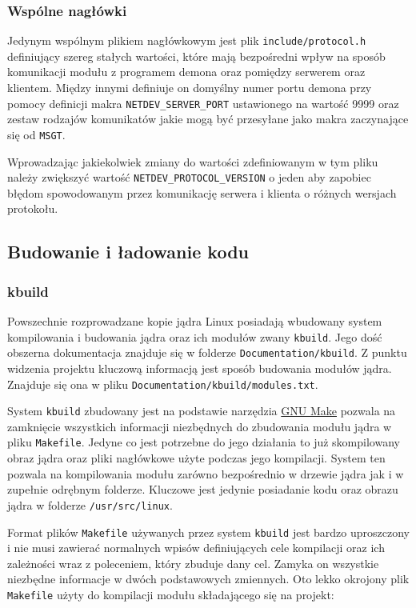 \documentclass[10pt]{article}
\begin{document}
\subsubsection{Wspólne nagłówki}

Jedynym wspólnym plikiem nagłówkowym jest plik
\texttt{include/protocol.h} definiujący szereg stałych wartości, które
mają bezpośredni wpływ na sposób komunikacji modułu z programem demona
oraz pomiędzy serwerem oraz klientem. Między innymi definiuje on
domyślny numer portu demona przy pomocy definicji makra
\texttt{NETDEV\_SERVER\_PORT} ustawionego na wartość 9999 oraz zestaw
rodzajów komunikatów jakie mogą być przesyłane jako makra zaczynające
się od \texttt{MSGT}.

Wprowadzając jakiekolwiek zmiany do wartości zdefiniowanym w tym pliku
należy zwiększyć wartość \texttt{NETDEV\_PROTOCOL\_VERSION} o jeden aby
zapobiec błędom spowodowanym przez komunikację serwera i klienta o
różnych wersjach protokołu.

\subsection{Budowanie i ładowanie kodu}

\subsubsection{kbuild}

Powszechnie rozprowadzane kopie jądra Linux posiadają wbudowany system
kompilowania i budowania jądra oraz ich modułów zwany \texttt{kbuild}.
Jego dość obszerna dokumentacja znajduje się w folderze
\texttt{Documentation/kbuild}. Z punktu widzenia projektu kluczową
informacją jest sposób budowania modułów jądra. Znajduje się ona w pliku
\texttt{Documentation/kbuild/modules.txt}.

System \texttt{kbuild} zbudowany jest na podstawie narzędzia
\href{https://www.gnu.org/software/make/}{GNU Make} pozwala na
zamknięcie wszystkich informacji niezbędnych do zbudowania modułu jądra
w pliku \texttt{Makefile}. Jedyne co jest potrzebne do jego działania to
już skompilowany obraz jądra oraz pliki nagłówkowe użyte podczas jego
kompilacji. System ten pozwala na kompilowania modułu zarówno
bezpośrednio w drzewie jądra jak i w zupełnie odrębnym folderze.
Kluczowe jest jedynie posiadanie kodu oraz obrazu jądra w folderze
\texttt{/usr/src/linux}.

Format plików \texttt{Makefile} używanych przez system \texttt{kbuild}
jest bardzo uproszczony i nie musi zawierać normalnych wpisów
definiujących cele kompilacji oraz ich zależności wraz z poleceniem,
który zbuduje dany cel. Zamyka on wszystkie niezbędne informacje w dwóch
podstawowych zmiennych. Oto lekko okrojony plik \texttt{Makefile} użyty
do kompilacji modułu składającego się na projekt:
\end{document}
